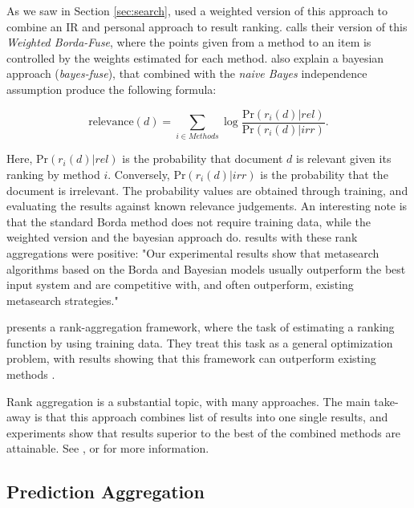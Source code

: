 As we saw in Section \ref{sec:search}, \citet[p3]{Xu2008} used a weighted version
of this approach to combine an IR and personal approach to result ranking.
\citet[p3]{Aslam2001} calls their version of this \emph{Weighted Borda-Fuse},
where the points given from a method to an item is controlled
by the weights estimated for each method.
\citet[p4]{Aslam2001} also explain a bayesian approach (\emph{bayes-fuse}),
that combined with the \emph{naive Bayes} independence assumption 
produce the following formula:

\begin{equation*}
  \mathrm{relevance}(d)  = \sum_{i \in Methods} \log 
    \frac{ \mathrm{Pr}(r_i(d) | rel) }{ \mathrm{Pr}(r_i(d) | irr) }.
\end{equation*}

Here, $\mathrm{Pr}(r_i(d) | rel)$ is the probability that document $d$
is relevant given its ranking by method $i$.
Conversely, $\mathrm{Pr}(r_i(d) | irr)$ is the probability that the document 
is irrelevant. The probability values are obtained through training,
and evaluating the results against known relevance judgements.
An interesting note is that the standard Borda method does not require training data,
while the weighted version and the bayesian approach do.
\citet[p1]{Aslam2001} results with these rank aggregations were positive:
"Our experimental results show that metasearch algorithms based on the 
Borda and Bayesian models usually outperform the best input system 
and are competitive with, and often outperform, 
existing metasearch strategies."

\cite{Liu2007} presents a rank-aggregation framework, where
the task of estimating a ranking function by using training data.
They treat this task as a general optimization problem, with results
showing that this framework can outperform existing methods \cite[p7]{Liu2007}.

Rank aggregation is a substantial topic, with many approaches.
The main take-away is that this approach combines list of results
into one single results, and experiments show that results superior
to the best of the combined methods are attainable.
See \cite{Aslam2001}, \cite{Liu2007} or \cite{Klementiev2008} 
for more information.


\subsection{Prediction Aggregation}
\label{sec:theory:predictionagg}

